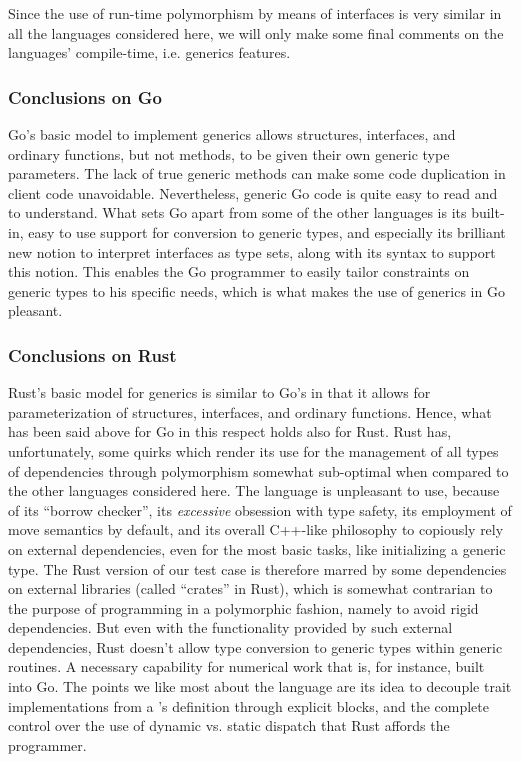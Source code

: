 \documentclass[11pt,oneside]{article}
\newcommand{\code}[1]{{\selectfont\ttfamily{#1}}}
\begin{document}
Since the use of run-time polymorphism by means of interfaces is very
similar in all the languages considered here, we will only make some final
comments on the languages' compile-time, i.e.  generics features.

\subsubsection{Conclusions on Go}

Go's basic model to implement generics allows structures, interfaces,
and ordinary functions, but not methods, to be given their own generic
type parameters. The lack of true generic methods can make some code
duplication in client code unavoidable. Nevertheless, generic Go code
is quite easy to read and to understand. What sets Go apart from some
of the other languages is its built-in, easy to use support for
conversion to generic types, and especially its brilliant new notion
to interpret interfaces as type sets, along with its syntax to support
this notion. This enables the Go programmer to easily tailor
constraints on generic types to his specific needs, which is what
makes the use of generics in Go pleasant.

\subsubsection{Conclusions on Rust}

Rust's basic model for generics is similar to Go's in that it allows
for parameterization of structures, interfaces, and ordinary
functions. Hence, what has been said above for Go in this respect
holds also for Rust. Rust has, unfortunately, some quirks which render
its use for the management of all types of dependencies through
polymorphism somewhat sub-optimal when compared to the other languages
considered here. The language is unpleasant to use, because of its
``borrow checker'', its \emph{excessive} obsession with type safety,
its employment of move semantics by default, and its overall C++-like
philosophy to copiously rely on external dependencies, even for the
most basic tasks, like initializing a generic type. The Rust version
of our test case is therefore marred by some dependencies on external
libraries (called ``crates'' in Rust), which is somewhat contrarian to
the purpose of programming in a polymorphic fashion, namely to avoid
rigid dependencies. But even with the functionality provided by such
external dependencies, Rust doesn't allow type conversion to generic
types within generic routines. A necessary capability for numerical
work that is, for instance, built into Go. The points we like most
about the language are its idea to decouple trait implementations from
a \code{struct}'s definition through explicit \code{impl} blocks,
and the complete control over the use of dynamic vs. static dispatch
that Rust affords the programmer.
\end{document}
